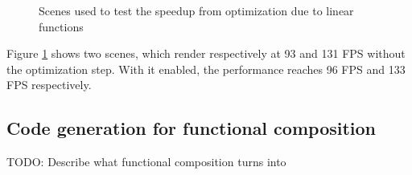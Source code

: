 \begin{figure}[h!]
  \centering
  \caption{Scenes used to test the speedup from optimization due to linear functions}
  \label{fig:linFuncOpt}
\end{figure}

Figure \ref{fig:linFuncOpt} shows two scenes, which render respectively at 93 and 131 FPS without the optimization step. With it enabled, the performance reaches 96 FPS and 133 FPS respectively.

\subsection{Code generation for functional composition}

TODO: Describe what functional composition turns into
